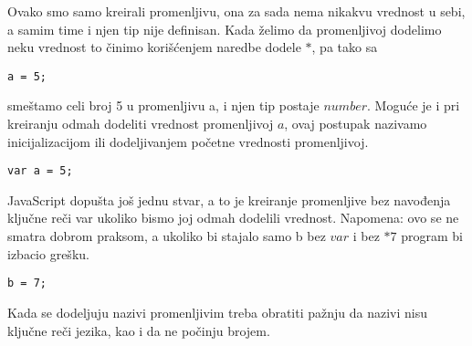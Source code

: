 Ovako smo samo kreirali promenljivu, ona za sada nema nikakvu vrednost u sebi, a samim time i njen tip nije definisan. Kada želimo da promenljivoj dodelimo neku vrednost to činimo korišćenjem naredbe dodele $*$, pa tako sa
\begin{lstlisting}[backgroundcolor = \color{lightgray}, breaklines=true]
a = 5;    
\end{lstlisting}
smeštamo celi broj 5 u promenljivu a, i njen tip postaje $number$.
Moguće je i pri kreiranju odmah dodeliti vrednost promenljivoj $a$, ovaj postupak nazivamo inicijalizacijom ili dodeljivanjem početne vrednosti promenljivoj.
\begin{lstlisting}[backgroundcolor = \color{lightgray}, breaklines=true]
var a = 5;    
\end{lstlisting}
JavaScript dopušta još jednu stvar, a to je kreiranje promenljive bez navođenja ključne reči var ukoliko bismo joj odmah dodelili vrednost. Napomena: ovo se ne smatra dobrom praksom, a ukoliko bi stajalo samo b bez $var$ i bez $*7$ program bi izbacio grešku.
\begin{lstlisting}[backgroundcolor = \color{lightgray}, breaklines=true]
b = 7;    
\end{lstlisting}
Kada se dodeljuju nazivi promenljivim treba obratiti pažnju da nazivi nisu ključne reči jezika, kao i da ne počinju brojem.\\\\

